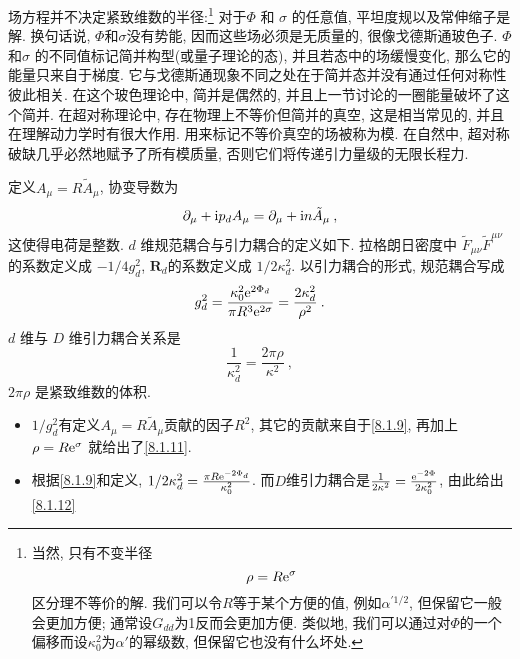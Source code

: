 场方程并不决定紧致维数的半径:\footnote{
当然, 只有不变半径
\[
	\rho=R \mathrm{e}^{\sigma}
\]	
区分理不等价的解. 我们可以令$R$等于某个方便的值, 例如$\alpha^{\prime 1/2}$, 但保留它一般会更加方便; 通常设$G_{dd}$为1反而会更加方便. 
类似地, 我们可以通过对$\Phi$的一个偏移而设$\kappa_{0}^{2}$为$\alpha'$的幂级数, 但保留它也没有什么坏处.} 对于$\Phi$ 和 $\sigma $ 的任意值, 平坦度规以及常伸缩子是解. 换句话说, $\Phi$和$\sigma$没有势能, 因而这些场必须是无质量的, 很像戈德斯通玻色子. $\Phi$和$\sigma$ 的不同值标记简并构型(或量子理论的态), 并且若态中的场缓慢变化, 那么它的能量只来自于梯度. 它与戈德斯通现象不同之处在于简并态并没有通过任何对称性彼此相关. 在这个玻色理论中, 简并是偶然的, 并且上一节讨论的一圈能量破坏了这个简并. 在超对称理论中, 存在物理上不等价但简并的真空, 这是相当常见的, 并且在理解动力学时有很大作用. 用来标记不等价真空的场被称为模. 在自然中, 超对称破缺几乎必然地赋予了所有模质量, 否则它们将传递引力量级的无限长程力.

定义$A_{\mu}=R \tilde{A}_{\mu}$, 协变导数为
\begin{equation}
	\partial_{\mu}+\mathrm{i} p_{d} A_{\mu}=\partial_{\mu}+\mathrm{i} n \tilde{A}_{\mu} \:, \label{8.1.10}
\end{equation}
这使得电荷是整数.  $d$ 维规范耦合与引力耦合的定义如下. 拉格朗日密度中 $\tilde{F}_{\mu \nu} \tilde{F}^{\mu \nu}$的系数定义成 $-1 / 4 g_{d}^{2}$, 
$\bm{R}_{d}$的系数定义成 $1 / 2 \kappa_{d}^{2}$. 以引力耦合的形式, 规范耦合写成
\begin{equation}
	g_{d}^{2}=\frac{\kappa_{0}^{2} \mathrm{e}^{2 \Phi_{d}}}{\pi R^{3} \mathrm{e}^{2 \sigma}}=\frac{2 \kappa_{d}^{2}}{\rho^{2}} \:. \label{8.1.11}
\end{equation}
$d$ 维与 $D$ 维引力耦合关系是
\begin{equation}
	\frac{1}{\kappa_{d}^{2}}=\frac{2 \pi \rho}{\kappa^{2}} \:, \label{8.1.12}
\end{equation}
$2 \pi \rho$ 是紧致维数的体积.
\begin{tcolorbox}
	\begin{remark}
		\begin{itemize}
			\item $1 / g_{d}^{2}$有定义$A_{\mu}=R \tilde{A}_{\mu}$贡献的因子$R^{2}$, 其它的贡献来自于\eqref{8.1.9}, 再加上 $\rho=R\mathrm{e}^{\sigma}$ 就给出了\eqref{8.1.11}.
			\item 根据\eqref{8.1.9}和定义, $1 / 2 \kappa_{d}^{2}=\frac{\pi R \mathrm{e}^{-2 \Phi_d}}{\kappa_{0}^{2}}$. 而$D$维引力耦合是$\frac{1}{2 \kappa^{2}}=\frac{\mathrm{e}^{-2 \Phi}}{2 \kappa_{0}^{2}}$, 由此给出\eqref{8.1.12}
		\end{itemize}
	\end{remark}
\end{tcolorbox}

